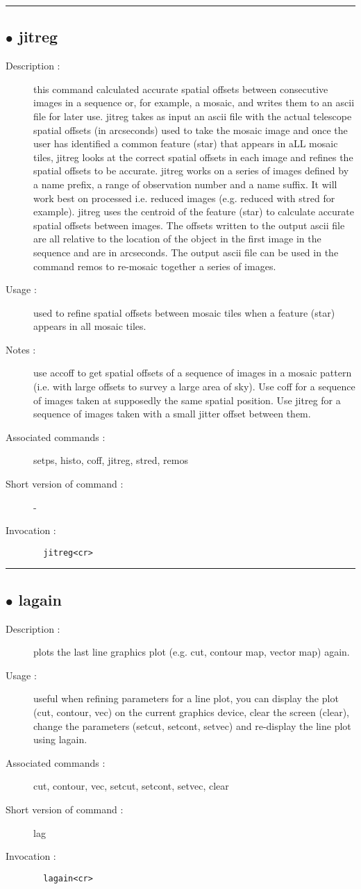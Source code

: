 \hrule \subsection*{$\bullet$ jitreg}
\begin{description}
\item[Description :] this command calculated accurate spatial offsets between
consecutive images in a sequence or, for example, a mosaic, and writes
them to an ascii file for later use.  jitreg takes as input an ascii file
with the actual telescope spatial offsets (in arcseconds) used to take
the mosaic image and once the user has identified a common feature (star)
that appears in aLL mosaic tiles, jitreg looks at the correct spatial
offsets in each image and refines the spatial offsets to be accurate.
jitreg works on a series of images defined by a name prefix, a range of
observation number and a name suffix.  It will work best on processed
i.e. reduced images (e.g. reduced with stred for example).  jitreg uses
the centroid of the feature (star) to calculate accurate spatial offsets
between images.  The offsets written to the output ascii file are all
relative to the location of the object in the first image in the sequence
and are in arcseconds.  The output ascii file can be used in the command
remos to re-mosaic together a series of images.
\item[Usage :] used to refine spatial offsets between mosaic tiles when a
feature (star) appears in all mosaic tiles.
\item[Notes :] use accoff to get spatial offsets of a sequence of images in a
mosaic pattern (i.e. with large offsets to survey a large area of sky).
Use coff for a sequence of images taken at supposedly the same spatial
position. Use jitreg for a sequence of images taken with a small jitter
offset between them.
\item[Associated commands :] setps, histo, coff, jitreg, stred, remos
\item[Short version of command :] -
\item[Invocation :]

\verb+  jitreg<cr> +\end{description}

\hrule \subsection*{$\bullet$ lagain}
\begin{description}
\item[Description :] plots the last line graphics plot (e.g. cut, contour map, vector
map) again.  
\item[Usage :] useful when refining parameters for a line plot, you can display
the plot (cut, contour, vec) on the current graphics device, clear the
screen (clear), change the parameters (setcut, setcont, setvec) and
re-display the line plot using lagain.
\item[Associated commands :] cut, contour, vec, setcut, setcont, setvec, clear
\item[Short version of command :] lag
\item[Invocation :]

\verb+  lagain<cr> +\end{description}

